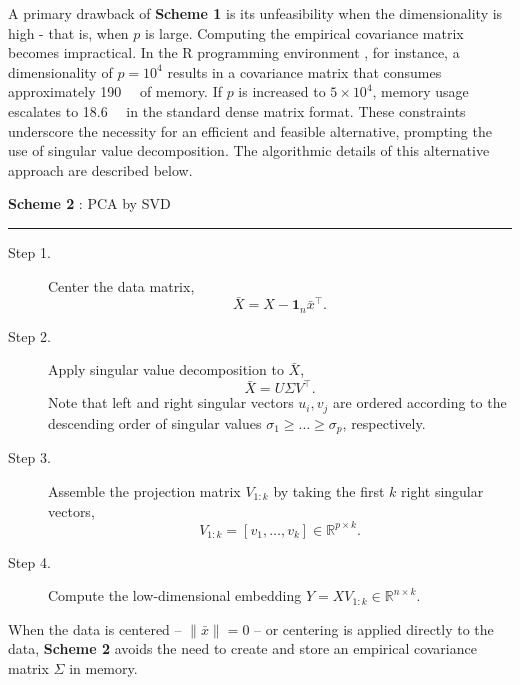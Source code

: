 \documentclass[11pt]{article}
\newcommand{\bbR}{\mathbb{R}}
\newcommand{\bfone}{\mathbf{1}}
\begin{document}
A primary drawback of \textbf{Scheme 1} is its unfeasibility when the dimensionality is high - that is, when $p$ is large. Computing the empirical covariance matrix becomes impractical. In the \textsf{R} programming environment \citep{rcoreteam_2022_LanguageEnvironmentStatistical}, for instance, a dimensionality of $p=10^4$ results in a covariance matrix that consumes approximately \qty{190}{\mega\byte} of memory. If $p$ is increased to $5 \times 10^4$, memory usage escalates to \qty{18.6}{\giga\byte} in the standard dense matrix format. These constraints underscore the necessity for an efficient and feasible alternative, prompting the use of singular value decomposition. The algorithmic details of this alternative approach are described below.

\vspace{0.25cm}
\begin{tcolorbox}
	\begin{center}
		\textbf{Scheme 2} : PCA by SVD
	\end{center}
	\vspace{-.15cm}
	\hrule
	\begin{description}
		\item[Step 1.] Center the data matrix,
		\begin{equation*}
			\bar{X} = X - \bfone_n \bar{x}^\top.
		\end{equation*}
		\item[Step 2.] Apply singular value decomposition to $\bar{X}$,
		\begin{equation*}
			\bar{X} = U \Sigma V^\top.
		\end{equation*}
		Note that left and right singular vectors $u_i, v_j$ are ordered according to the descending order of singular values $\sigma_1 \geq \ldots \geq  \sigma_p$, respectively.
		\item[Step 3.] Assemble the projection matrix $V_{1:k}$ by taking the first $k$ right singular vectors,
		\begin{equation*}
			V_{1:k} = [v_1, \ldots, v_k] \in \bbR^{p\times k}.
		\end{equation*}
		\item[Step 4.] Compute the low-dimensional embedding $Y = X V_{1:k} \in \mathbb{R}^{n\times k}$. 
	\end{description}
\end{tcolorbox}


When the data is centered -- $\|\bar{x}\| = 0$ -- or centering is applied directly to the data, \textbf{Scheme 2} avoids the need to create and store an empirical covariance matrix $\hat{\Sigma}$ in memory.
\end{document}
